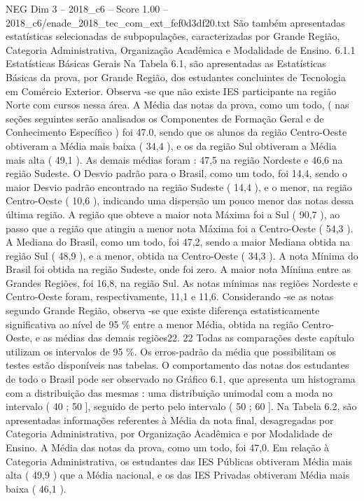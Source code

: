 \begin{textsample}{NEG Dim 3 – 2018\_c6 – Score 1.00 – 2018\_c6/enade\_2018\_tec\_com\_ext\_fef0d3df20.txt}
São também apresentadas estatísticas selecionadas de subpopulações, caracterizadas por Grande Região, Categoria Administrativa, Organização Acadêmica e Modalidade de Ensino. 6.1.1 Estatísticas Básicas Gerais Na Tabela 6.1, são apresentadas as Estatísticas Básicas da prova, por Grande Região, dos estudantes concluintes de Tecnologia em Comércio Exterior.
Observa -se que não existe IES participante na região Norte com cursos nessa área.
A Média das notas da prova, como um todo, ( nas seções seguintes serão analisados os Componentes de Formação Geral e de Conhecimento Específico ) foi 47.0, sendo que os alunos da região Centro-Oeste obtiveram a Média mais baixa ( 34,4 ), e os da região Sul obtiveram a Média mais alta ( 49,1 ).
As demais médias foram : 47,5 na região Nordeste e 46,6 na região Sudeste.
O Desvio padrão para o Brasil, como um todo, foi 14,4, sendo o maior Desvio padrão encontrado na região Sudeste ( 14,4 ), e o menor, na região Centro-Oeste ( 10,6 ), indicando uma dispersão um pouco menor das notas dessa última região.
A região que obteve a maior nota Máxima foi a Sul ( 90,7 ), ao passo que a região que atingiu a menor nota Máxima foi a Centro-Oeste ( 54,3 ).
A Mediana do Brasil, como um todo, foi 47,2, sendo a maior Mediana obtida na região Sul ( 48,9 ), e a menor, obtida na Centro-Oeste ( 34,3 ).
A nota Mínima do Brasil foi obtida na região Sudeste, onde foi zero.
A maior nota Mínima entre as Grandes Regiões, foi 16,8, na região Sul.
As notas mínimas nas regiões Nordeste e Centro-Oeste foram, respectivamente, 11,1 e 11,6.
Considerando -se as notas segundo Grande Região, observa -se que existe diferença estatisticamente significativa ao nível de 95 \% entre a menor Média, obtida na região Centro-Oeste, e as médias das demais regiões22. 22 Todas as comparações deste capítulo utilizam os intervalos de 95 \%.
Os erros-padrão da média que possibilitam os testes estão disponíveis nas tabelas.
O comportamento das notas dos estudantes de todo o Brasil pode ser observado no Gráfico 6.1, que apresenta um histograma com a distribuição das mesmas : uma distribuição unimodal com a moda no intervalo ( 40 ; 50 ], seguido de perto pelo intervalo ( 50 ; 60 ].
Na Tabela 6.2, são apresentadas informações referentes à Média da nota final, desagregadas por Categoria Administrativa, por Organização Acadêmica e por Modalidade de Ensino.
A Média das notas da prova, como um todo, foi 47,0.
Em relação à Categoria Administrativa, os estudantes das IES Públicas obtiveram Média mais alta ( 49,9 ) que a Média nacional, e os das IES Privadas obtiveram Média mais baixa ( 46,1 ).

\end{textsample}
